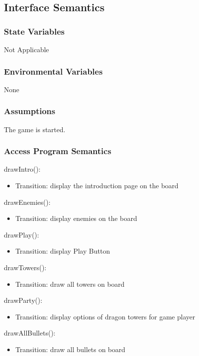 \documentclass[12,english]{article}
\begin{document}
\subsection{Interface Semantics}
\subsubsection{State Variables}
Not Applicable 
\subsubsection{Environmental Variables}
None
\subsubsection{Assumptions}
The game is started. 
\subsubsection{Access Program Semantics}

\noindent drawIntro():
\begin{itemize}
    \item Transition: display the introduction page on the board
\end{itemize}

\noindent drawEnemies():
\begin{itemize}
    \item Transition: display enemies on the board
\end{itemize}

\noindent drawPlay():
\begin{itemize}
    \item Transition: display Play Button
\end{itemize}

\noindent drawTowers():
\begin{itemize}
    \item Transition: draw all towers on board
\end{itemize}

\noindent drawParty():
\begin{itemize}
    \item Transition: display options of dragon towers for game player 
\end{itemize}

\noindent drawAllBullets():
\begin{itemize}
    \item Transition: draw all bullets on board
\end{itemize}
\end{document}
